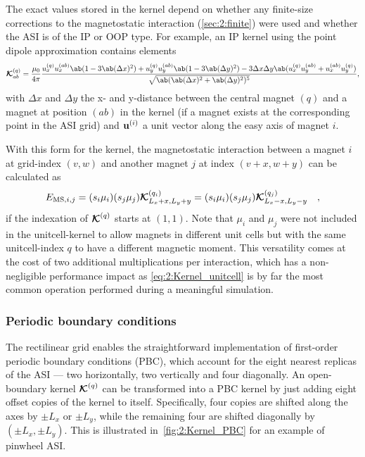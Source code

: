 The exact values stored in the kernel depend on whether any finite-size corrections to the magnetostatic interaction (\cref{sec:2:finite}) were used and whether the ASI is of the IP or OOP type. For example, an IP kernel using the point dipole approximation contains elements
\begin{equation}
	\label{eq:2:Kernel_detailed}
	\vc{\mathcal{K}}^{(q)}_{ab} = \frac{\mu_0}{4 \pi} \frac{
		u_x^{(q)} u_x^{(ab)} \ab(1 - 3 \ab(\Delta x)^2) + u_y^{(q)} u_y^{(ab)} \ab(1 - 3 \ab(\Delta y)^2) - 3\Delta x \Delta y \ab(u_x^{(q)} u_y^{(ab)} + u_x^{(ab)} u_y^{(q)})
	}{
		\sqrt{\ab(\ab(\Delta x)^2 + \ab(\Delta y)^2)^5}
	} \mathrm{,}
\end{equation}
with $\Delta x$ and $\Delta y$ the x- and y-distance between the central magnet $(q)$ and a magnet at position $(ab)$ in the kernel (if a magnet exists at the corresponding point in the ASI grid) and $\boldsymbol{\mathbf{u}}^{(i)}$ a unit vector along the easy axis of magnet $i$. \par
With this form for the kernel, the magnetostatic interaction between a magnet $i$ at grid-index $(v,w)$ and another magnet $j$ at index $(v+x, w+y)$ can be calculated as
\begin{equation}
	\label{eq:2:Kernel_unitcell}
	E_{\mathrm{MS},i,j} = (s_i \mu_i) (s_j \mu_j) \boldsymbol{\mathbf{\mathcal{K}}}^{(q_i)}_{L_x+x, L_y+y} = (s_i \mu_i) (s_j \mu_j) \boldsymbol{\mathbf{\mathcal{K}}}^{(q_j)}_{L_x-x, L_y-y} \quad \mathrm{,}
\end{equation}
if the indexation of $\boldsymbol{\mathbf{\mathcal{K}}}^{(q)}$ starts at $(1,1)$.
Note that $\mu_i$ and $\mu_j$ were not included in the unitcell-kernel to allow magnets in different unit cells but with the same unitcell-index $q$ to have a different magnetic moment.
This versatility comes at the cost of two additional multiplications per interaction, which has a non-negligible performance impact as \cref{eq:2:Kernel_unitcell} is by far the most common operation performed during a meaningful simulation. \\\par

\subsubsection{Periodic boundary conditions}
The rectilinear grid enables the straightforward implementation of first-order periodic boundary conditions (PBC), which account for the eight nearest replicas of the ASI --- two horizontally, two vertically and four diagonally.
An open-boundary kernel $\boldsymbol{\mathbf{\mathcal{K}}}^{(q)}$ can be transformed into a PBC kernel by just adding eight offset copies of the kernel to itself.
Specifically, four copies are shifted along the axes by $\pm L_x$ or $\pm L_y$, while the remaining four are shifted diagonally by $(\pm L_x, \pm L_y)$.
This is illustrated in~\cref{fig:2:Kernel_PBC} for an example of pinwheel ASI. \par

